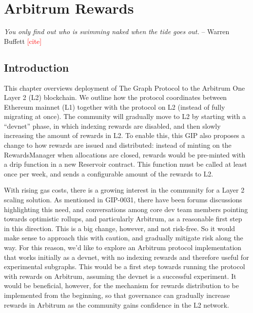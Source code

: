 \chapter{Arbitrum Rewards}
{\justifying

\textit{You only find out who is swimming naked when the tide goes out.} 
\newline \hspace*{10pt}\hfill -- Warren Buffett \textcolor{red}{[cite]}
\vspace{0.25in}

 
\section{Introduction}

This chapter overviews deployment of The Graph Protocol to the Arbitrum One Layer 2 (L2) blockchain. We outline how the protocol coordinates between Ethereum mainnet (L1) together with the protocol on L2 (instead of fully migrating at once). The community will gradually move to L2 by starting with a ``devnet'' phase, in which indexing rewards are disabled, and then slowly increasing the amount of rewards in L2. To enable this, this GIP also proposes a change to how rewards are issued and distributed: instead of minting on the RewardsManager when allocations are closed, rewards would be pre-minted with a drip function in a new Reservoir contract. This function must be called at least once per week, and sends a configurable amount of the rewards to L2.

With rising gas costs, there is a growing interest in the community for a Layer 2 scaling solution. As mentioned in GIP-0031, there have been forums discussions highlighting this need, and conversations among core dev team members pointing towards optimistic rollups, and particularly Arbitrum, as a reasonable first step in this direction. This is a big change, however, and not risk-free. So it would make sense to approach this with caution, and gradually mitigate risk along the way. For this reason, we’d like to explore an Arbitrum protocol implementation that works initially as a devnet, with no indexing rewards and therefore useful for experimental subgraphs. This would be a first step towards running the protocol with rewards on Arbitrum, assuming the devnet is a successful experiment. It would be beneficial, however, for the mechanism for rewards distribution to be implemented from the beginning, so that governance can gradually increase rewards in Arbitrum as the community gains confidence in the L2 network.


}
